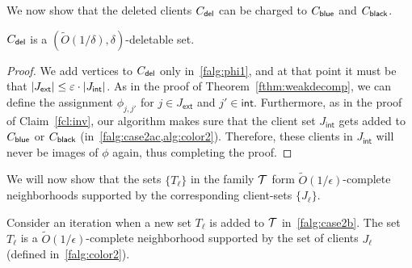 We now show that the deleted clients $C_{\mathsf{del}}$ can be charged to $C_{\mathsf{blue}}$ and $C_{\mathsf{black}}$.
\begin{claim} \label{fcl:phi-augment}
$C_{\mathsf{del}}$ is a $(\tilde{O}(1/\delta),\delta)$-deletable set.
\end{claim}
\begin{proof}
	We add vertices to $C_{\mathsf{del}}$ only in~\cref{falg:phi1}, and at that point it must be that $|J_\mathsf{ext}| \leq \varepsilon\cdot |J_\mathsf{int}|$.
	As in the proof of Theorem~\ref{fthm:weakdecomp}, we can define the assignment $\phi_{j,j'}$ for $j\in J_\mathsf{ext}$ and $j' \in \mathsf{int}$.
Furthermore, as in the proof of Claim~\ref{fcl:inv}, our algorithm makes sure that the client set $J_\mathsf{int}$ gets added to $C_{\mathsf{blue}}$ or $C_{\mathsf{black}}$ (in~\cref{falg:case2ac,alg:color2}).
Therefore, these clients in $J_\mathsf{int}$ will never be images of $\phi$ again, thus completing the proof.
\end{proof}


We will now show that the sets $\{T_\ell\}$ in the family ${\cal T}$ form $\tilde{O}(1/\epsilon)$-complete neighborhoods supported by the corresponding client-sets $\{J_\ell\}$.
\begin{lemma} \label{flem:local}
Consider an iteration when a new set $T_\ell$ is added to ${\cal T}$ in~\cref{falg:case2b}. The set $T_\ell$ is a $\tilde{O}(1/\epsilon)$-complete neighborhood supported by the set of clients $J_\ell$ (defined in~\cref{falg:color2}).
\end{lemma}

